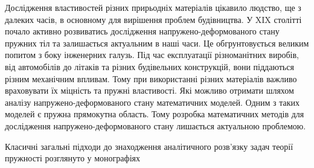 
Дослідження властивостей різних прирьодніх матеріалів цікавило людство, ще з далеких часів,
в основному для вирішення проблем будівництва.
У XIX столітті почало активно розвиватись дослідження напружено-деформованого стану пружних тіл та залишається актуальним в наші часи.
Це обгрунтовується великим попитом з боку інженерних галузь.
Під час експлуатації різноманітних виробів, від автомобілів до літаків та різних будівельних конструкцій, вони піддаються різним механічним впливам.
Тому при використанні різних матеріалів важливо враховувати їх міцність та пружні властивості.
Які можливо отримати шляхом аналізу напружено-деформованого стану математичних моделей.
Одним з таких моделей є пружна прямокутна область.
Тому розробка математичних методів для дослідження напружено-деформованого стану лишається актуальною проблемою.

Класичні загальні підходи до знаходження аналітичного розв'язку задач теорії пружності розглянуто у монографіях 